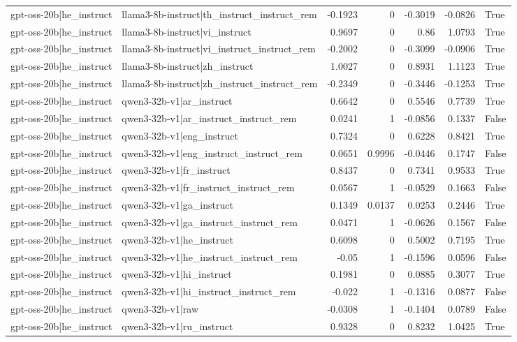 \begin{table}
\begin{tabular}{l l r r r r l}
gpt-oss-20b|he_instruct & llama3-8b-instruct|th_instruct_instruct_rem & -0.1923 & 0 & -0.3019 & -0.0826 & True \\
gpt-oss-20b|he_instruct & llama3-8b-instruct|vi_instruct & 0.9697 & 0 & 0.86 & 1.0793 & True \\
gpt-oss-20b|he_instruct & llama3-8b-instruct|vi_instruct_instruct_rem & -0.2002 & 0 & -0.3099 & -0.0906 & True \\
gpt-oss-20b|he_instruct & llama3-8b-instruct|zh_instruct & 1.0027 & 0 & 0.8931 & 1.1123 & True \\
gpt-oss-20b|he_instruct & llama3-8b-instruct|zh_instruct_instruct_rem & -0.2349 & 0 & -0.3446 & -0.1253 & True \\
gpt-oss-20b|he_instruct & qwen3-32b-v1|ar_instruct & 0.6642 & 0 & 0.5546 & 0.7739 & True \\
gpt-oss-20b|he_instruct & qwen3-32b-v1|ar_instruct_instruct_rem & 0.0241 & 1 & -0.0856 & 0.1337 & False \\
gpt-oss-20b|he_instruct & qwen3-32b-v1|eng_instruct & 0.7324 & 0 & 0.6228 & 0.8421 & True \\
gpt-oss-20b|he_instruct & qwen3-32b-v1|eng_instruct_instruct_rem & 0.0651 & 0.9996 & -0.0446 & 0.1747 & False \\
gpt-oss-20b|he_instruct & qwen3-32b-v1|fr_instruct & 0.8437 & 0 & 0.7341 & 0.9533 & True \\
gpt-oss-20b|he_instruct & qwen3-32b-v1|fr_instruct_instruct_rem & 0.0567 & 1 & -0.0529 & 0.1663 & False \\
gpt-oss-20b|he_instruct & qwen3-32b-v1|ga_instruct & 0.1349 & 0.0137 & 0.0253 & 0.2446 & True \\
gpt-oss-20b|he_instruct & qwen3-32b-v1|ga_instruct_instruct_rem & 0.0471 & 1 & -0.0626 & 0.1567 & False \\
gpt-oss-20b|he_instruct & qwen3-32b-v1|he_instruct & 0.6098 & 0 & 0.5002 & 0.7195 & True \\
gpt-oss-20b|he_instruct & qwen3-32b-v1|he_instruct_instruct_rem & -0.05 & 1 & -0.1596 & 0.0596 & False \\
gpt-oss-20b|he_instruct & qwen3-32b-v1|hi_instruct & 0.1981 & 0 & 0.0885 & 0.3077 & True \\
gpt-oss-20b|he_instruct & qwen3-32b-v1|hi_instruct_instruct_rem & -0.022 & 1 & -0.1316 & 0.0877 & False \\
gpt-oss-20b|he_instruct & qwen3-32b-v1|raw & -0.0308 & 1 & -0.1404 & 0.0789 & False \\
gpt-oss-20b|he_instruct & qwen3-32b-v1|ru_instruct & 0.9328 & 0 & 0.8232 & 1.0425 & True \\

\end{tabular}
\end{table}
